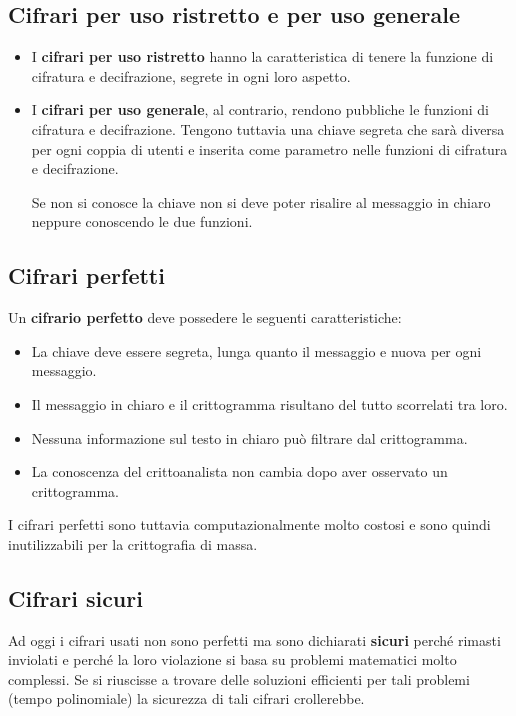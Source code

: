 \subsection{Cifrari per uso ristretto e per uso generale}
\begin{itemize}
	\item I \textbf{cifrari per uso ristretto} hanno la caratteristica di tenere la funzione di cifratura e
	      decifrazione, segrete in ogni loro aspetto.
	\item I \textbf{cifrari per uso generale}, al contrario, rendono pubbliche le funzioni di cifratura e decifrazione.
	      Tengono tuttavia una chiave segreta che sar\`a diversa per ogni coppia di utenti e inserita come parametro
	      nelle funzioni di cifratura e decifrazione.

	      Se non si conosce la chiave non si deve poter risalire al messaggio in chiaro neppure conoscendo le due
	      funzioni.
\end{itemize}

\subsection{Cifrari perfetti}
Un \textbf{cifrario perfetto} deve possedere le seguenti caratteristiche:
\begin{itemize}
	\item La chiave deve essere segreta, lunga quanto il messaggio e nuova per ogni messaggio.
	\item Il messaggio in chiaro e il crittogramma risultano del tutto scorrelati tra loro.
	\item Nessuna informazione sul testo in chiaro pu\`o filtrare dal crittogramma.
	\item La conoscenza del crittoanalista non cambia dopo aver osservato un crittogramma.
\end{itemize}
I cifrari perfetti sono tuttavia computazionalmente molto costosi e sono quindi inutilizzabili per la crittografia di
massa.

\subsection{Cifrari sicuri}
Ad oggi i cifrari usati non sono perfetti ma sono dichiarati \textbf{sicuri} perch\'e rimasti inviolati e perch\'e la
loro violazione si basa su problemi matematici molto complessi. Se si riuscisse a trovare delle soluzioni efficienti
per tali problemi (tempo polinomiale) la sicurezza di tali cifrari crollerebbe.

